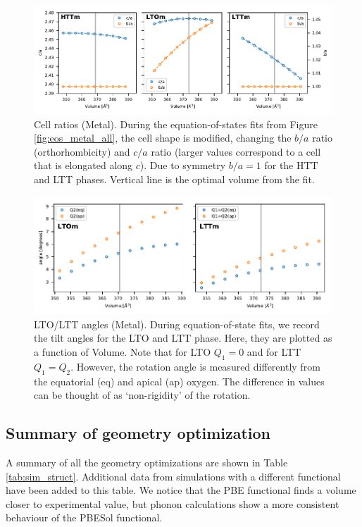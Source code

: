 \begin{figure}
    \centering
    \includegraphics[width=\textwidth]{fig/simulation/ratio_metal_all.pdf}
    \caption[Metal: Cell ratios during EOS fits]{Cell ratios (Metal). During the equation-of-states fits from Figure \ref{fig:eos_metal_all}, the cell shape is modified, changing the $b/a$ ratio (orthorhombicity) and $c/a$ ratio (larger values correspond to a cell that is elongated along $c$). Due to symmetry $b/a = 1$ for the HTT and LTT phases. Vertical line is the optimal volume from the fit.}
    \label{fig:eos_ratios_metal}
\end{figure}

\begin{figure}
	\centering
	\includegraphics[width=\textwidth]{fig/simulation/angles_metal_lto_ltt.pdf}
	\caption[Metal: LTO/LTT angles during EOS fits]{LTO/LTT angles (Metal). During equation-of-state fits, we record the tilt angles for the LTO and LTT phase. Here, they are plotted as a function of Volume. Note that for LTO $Q_1=0$ and for LTT $Q_1=Q_2$. However, the rotation angle is measured differently from the equatorial (eq) and apical (ap) oxygen. The difference in values can be thought of as `non-rigidity' of the rotation.}
	\label{fig:angles_metal}
\end{figure}


\subsection{Summary of geometry optimization}
A summary of all the geometry optimizations are shown in Table \ref{tab:sim_struct}. Additional data from simulations with a different functional have been added to this table. We notice that the PBE functional finds a volume closer to experimental value, but phonon calculations show a more consistent behaviour of the PBESol functional.

